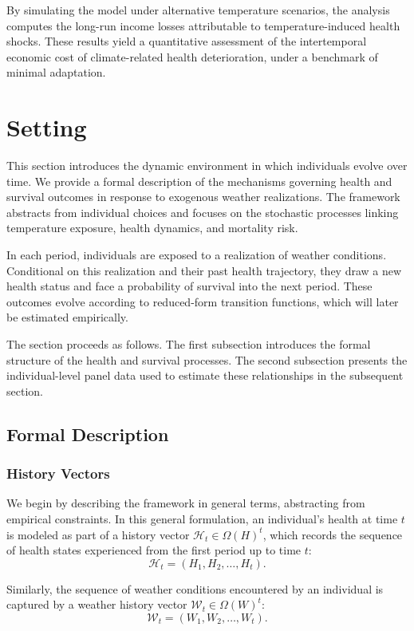 \documentclass{article}
\begin{document}
By simulating the model under alternative temperature scenarios, the analysis computes the long-run income losses attributable to temperature-induced health shocks. These results yield a quantitative assessment of the intertemporal economic cost of climate-related health deterioration, under a benchmark of minimal adaptation.

\section{Setting}

This section introduces the dynamic environment in which individuals evolve over time. 
We provide a formal description of the mechanisms governing health and survival outcomes in response to exogenous weather realizations. 
The framework abstracts from individual choices and focuses on the stochastic processes linking temperature exposure, health dynamics, and mortality risk.

In each period, individuals are exposed to a realization of weather conditions.
Conditional on this realization and their past health trajectory, they draw a new health status and face a probability of survival into the next period.
These outcomes evolve according to reduced-form transition functions, which will later be estimated empirically.

The section proceeds as follows.
The first subsection introduces the formal structure of the health and survival processes.
The second subsection presents the individual-level panel data used to estimate these relationships in the subsequent section.

\subsection{Formal Description}\label{formal_description}

\subsubsection{History Vectors}

We begin by describing the framework in general terms, abstracting from empirical constraints. In this general formulation, an individual’s health at time $t$ is modeled as part of a history vector $\mathcal{H}_t \in \Omega(H)^t$, which records the sequence of health states experienced from the first period up to time $t$:
\[
\mathcal{H}_t = (H_1, H_2, \dots, H_t).
\]

Similarly, the sequence of weather conditions encountered by an individual is captured by a weather history vector $\mathcal{W}_t \in \Omega(W)^t$:
\[
\mathcal{W}_t = (W_1, W_2, \dots, W_t).
\]
\end{document}
